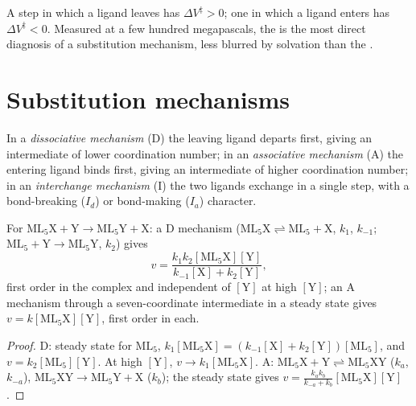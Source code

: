 A step in which a ligand leaves has $\Delta V^{\ddagger} > 0$; one in which a ligand enters has $\Delta V^{\ddagger}
< 0$. Measured at a few hundred megapascals, the  is the most
direct diagnosis of a substitution mechanism, less blurred by solvation than
the .

\section{Substitution mechanisms}

\begin{definition}\label{def:b3:complex-mechanisms:mechanisms}
In a \emph{dissociative mechanism} (D) the leaving
ligand departs first, giving an intermediate of lower coordination number; in an
\emph{associative mechanism} (A) the entering ligand
binds first, giving an intermediate of higher coordination number; in an
\emph{interchange mechanism} (I) the two ligands
exchange in a single step, with a bond-breaking ($I_d$) or bond-making ($I_a$)
character.
\end{definition}

\begin{proposition}\label{prop:b3:complex-mechanisms:d-a-laws}
For $\mathrm{ML_5X + Y \to ML_5Y + X}$: a D mechanism ($\mathrm{ML_5X} \rightleftharpoons \mathrm{ML_5} + \mathrm X$, $k_1$, $k_{-1}$; $\mathrm{ML_5} + \mathrm Y
\to \mathrm{ML_5Y}$, $k_2$) gives
\[
  v = \frac{k_1k_2[\mathrm{ML_5X}][\mathrm Y]}{k_{-1}[\mathrm X] + k_2[\mathrm Y]},
\]
first order in the complex and independent of $[\mathrm Y]$ at high $[\mathrm Y]$; an A mechanism
through a seven-coordinate intermediate in a steady state gives $v =
k[\mathrm{ML_5X}][\mathrm Y]$, first order in each.
\end{proposition}

\begin{proof}
D: steady state for $\mathrm{ML_5}$, $k_1[\mathrm{ML_5X}] = (k_{-1}[\mathrm X] + k_2[\mathrm Y])[\mathrm{ML_5}]$, and $v = k_2[\mathrm{ML_5}][\mathrm Y]$.
At high $[\mathrm Y]$, $v \to k_1[\mathrm{ML_5X}]$. A: $\mathrm{ML_5X} + \mathrm Y \rightleftharpoons \mathrm{ML_5XY}$ ($k_a$, $k_{-a}$), $\mathrm{ML_5XY} \to
\mathrm{ML_5Y} + \mathrm X$ ($k_b$); the steady state gives $v = \frac{k_ak_b}{k_{-a} + k_b}[\mathrm{ML_5X}][\mathrm Y]$.
\end{proof}

